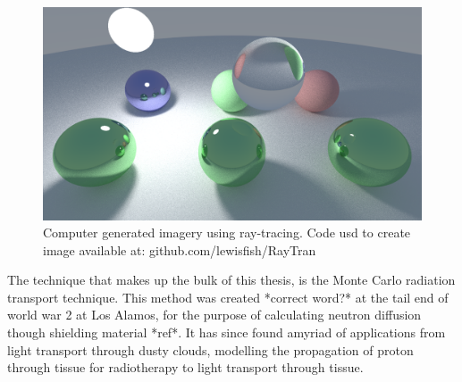 \begin{figure}
\centering
\includegraphics[width=\columnwidth]{./MCRT/images/ray-tracing.png}
\caption{Computer generated imagery using ray-tracing. Code usd to create image available at: github.com/lewisfish/RayTran}
\label{fig:ray-trace}
\end{figure}

The technique that makes up the bulk of this thesis, is the Monte Carlo radiation transport technique. This method was created *correct word?* at the tail end of world war 2 at Los Alamos, for the purpose of calculating neutron diffusion though shielding material *ref*. It has since found amyriad of applications from light transport through dusty clouds, modelling the propagation of proton through tissue for radiotherapy to light transport through tissue.